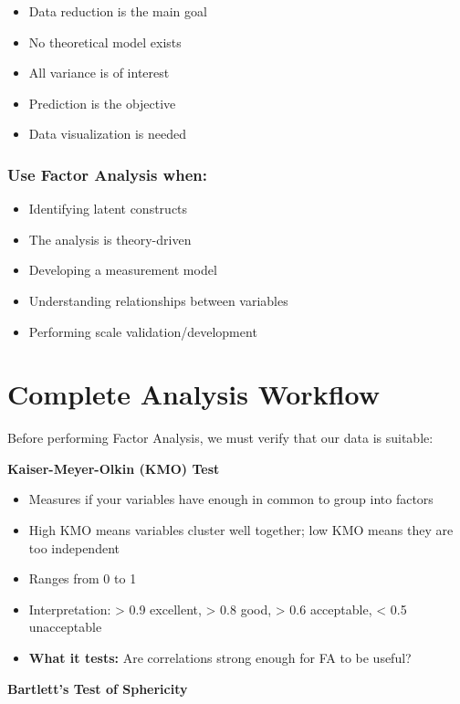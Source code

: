 \documentclass[
]{article}
\begin{document}
\begin{itemize}
\item
  Data reduction is the main goal
\item
  No theoretical model exists
\item
  All variance is of interest
\item
  Prediction is the objective
\item
  Data visualization is needed
\end{itemize}

\subsubsection{Use Factor Analysis when:}

\begin{itemize}
\item
  Identifying latent constructs
\item
  The analysis is theory-driven
\item
  Developing a measurement model
\item
  Understanding relationships between variables
\item
  Performing scale validation/development
\end{itemize}

\section{Complete Analysis Workflow}

Before performing Factor Analysis, we must verify that our data is
suitable:

\textbf{Kaiser-Meyer-Olkin (KMO) Test}

\begin{itemize}
\item
  Measures if your variables have enough in common to group into factors
\item
  High KMO means variables cluster well together; low KMO means they are
  too independent
\item
  Ranges from 0 to 1
\item
  Interpretation: \textgreater{} 0.9 excellent, \textgreater{} 0.8 good,
  \textgreater{} 0.6 acceptable, \textless{} 0.5 unacceptable
\item
  \textbf{What it tests:} Are correlations strong enough for FA to be
  useful?
\end{itemize}

\textbf{Bartlett's Test of Sphericity}
\end{document}
